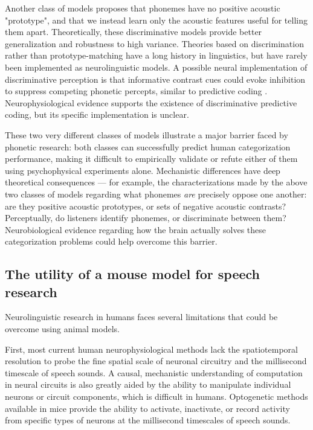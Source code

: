 Another class of models proposes that phonemes have no positive acoustic "prototype", and that we instead learn only the acoustic features useful for telling them apart\cite{Kluender2013a}. Theoretically, these discriminative models provide better generalization and robustness to high variance\cite{Ng2002a}. Theories based on discrimination rather than prototype-matching have a long history in linguistics\cite{Saussure1916}, but have rarely been implemented as neurolinguistic models. A possible neural implementation of discriminative perception is that informative contrast cues could evoke inhibition to suppress competing phonetic percepts, similar to predictive coding \cite{Rutishauser2015,Kluender2013a,Dresher2008}. Neurophysiological evidence supports the existence of discriminative predictive coding, but its specific implementation is unclear\cite{Blank2016,Gagnepain2012}.

These two very different classes of models illustrate a major barrier faced by phonetic research: both classes can successfully predict human categorization performance, making it difficult to empirically validate or refute either of them using psychophysical experiments alone. Mechanistic differences have deep theoretical consequences --- for example, the characterizations made by the above two classes of models regarding what phonemes \textit{are} precisely oppose one another: are they positive acoustic prototypes, or sets of negative acoustic contrasts? Perceptually, do listeners identify phonemes, or discriminate between them? Neurobiological evidence regarding how the brain actually solves these categorization problems could help overcome this barrier.

\subsection{The utility of a mouse model for speech research}

Neurolinguistic research in humans faces several limitations that could be overcome using animal models.

First, most current human neurophysiological methods lack the spatiotemporal resolution to probe the fine spatial scale of neuronal circuitry and the millisecond timescale of speech sounds. A causal, mechanistic understanding of computation in neural circuits is also greatly aided by the ability to manipulate individual neurons or circuit components, which is difficult in humans. Optogenetic methods available in mice provide the ability to activate, inactivate, or record activity from specific types of neurons at the millisecond timescales of speech sounds.

